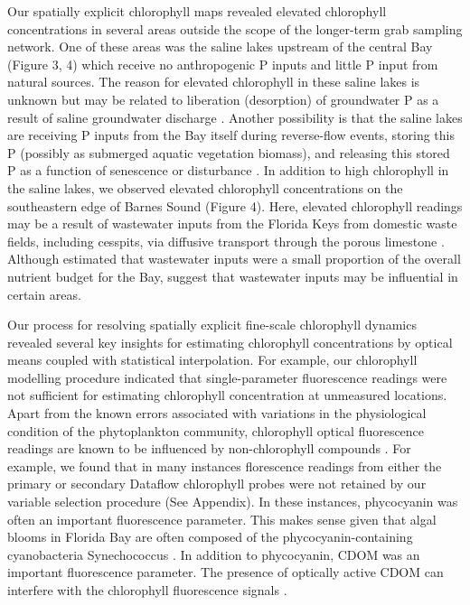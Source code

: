 Our spatially explicit chlorophyll maps revealed elevated chlorophyll concentrations in several areas outside the scope of the longer-term grab sampling network. One of these areas was the saline lakes upstream of the central Bay (Figure 3, 4) which receive no anthropogenic P inputs and little P input from natural sources. The reason for elevated chlorophyll in these saline lakes is unknown but may be related to liberation (desorption) of groundwater P as a result of saline groundwater discharge \citep{price2006coastal}. Another possibility is that the saline lakes are receiving P inputs from the Bay itself during reverse-flow events, storing this P (possibly as submerged aquatic vegetation biomass), and releasing this stored P as a function of senescence or disturbance \citep{rudnick1999phosphorus}.  In addition to high chlorophyll in the saline lakes, we observed elevated chlorophyll concentrations on the southeastern edge of Barnes Sound (Figure 4). Here, elevated chlorophyll readings may be a result of wastewater inputs from the Florida Keys from domestic waste fields, including cesspits, via diffusive transport through the porous limestone \citep{rudnick1999phosphorus}. Although \citet{rudnick1999phosphorus} estimated that wastewater inputs were a small proportion of the overall nutrient budget for the Bay, \citet{szmant1996water} suggest that wastewater inputs may be influential in certain areas. 

Our process for resolving spatially explicit fine-scale chlorophyll dynamics revealed several key insights for estimating chlorophyll concentrations by optical means coupled with statistical interpolation. For example, our chlorophyll modelling procedure indicated that single-parameter fluorescence readings were not sufficient for estimating chlorophyll concentration at unmeasured locations. Apart from the known errors associated with variations in the physiological condition of the phytoplankton community, chlorophyll optical fluorescence readings are known to be influenced by non-chlorophyll compounds \citep{proctor2010new}. For example, we found that in many instances florescence readings from either the primary or secondary Dataflow chlorophyll probes were not retained by our variable selection procedure (See Appendix). In these instances, phycocyanin was often an important fluorescence parameter. This makes sense given that algal blooms in Florida Bay are often composed of the phycocyanin-containing cyanobacteria Synechococcus \citep{phlips_blooms_1999}. In addition to phycocyanin, CDOM was an important fluorescence parameter. The presence of optically active CDOM can interfere with the chlorophyll fluorescence signals \citep{proctor2010new}. 

